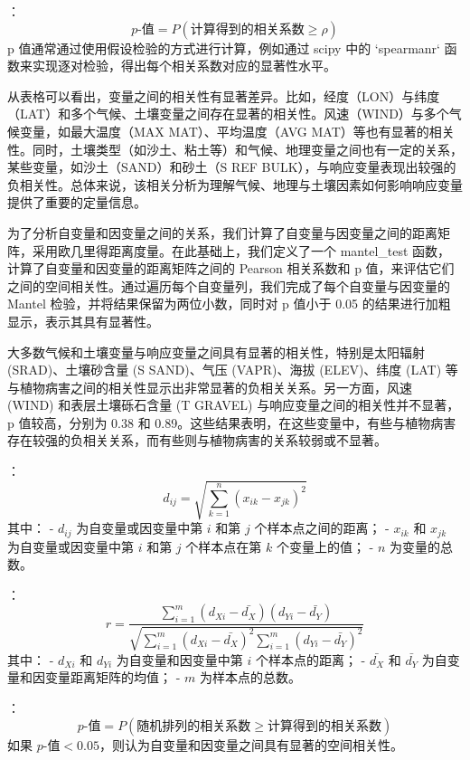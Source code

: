 \documentclass[AutoFakeBold]{LZUThesis-PgD&PhD}
\begin{document}
	：
	\[
	p\text{-值} = P(\text{计算得到的相关系数} \geq \rho)
	\]
	p 值通常通过使用假设检验的方式进行计算，例如通过 scipy 中的 `spearmanr` 函数来实现逐对检验，得出每个相关系数对应的显著性水平。
	
	从表格可以看出，变量之间的相关性有显著差异。比如，经度（LON）与纬度（LAT）和多个气候、土壤变量之间存在显著的相关性。风速（WIND）与多个气候变量，如最大温度（MAX MAT）、平均温度（AVG MAT）等也有显著的相关性。同时，土壤类型（如沙土、粘土等）和气候、地理变量之间也有一定的关系，某些变量，如沙土（SAND）和砂土（S REF BULK），与响应变量表现出较强的负相关性。总体来说，该相关分析为理解气候、地理与土壤因素如何影响响应变量提供了重要的定量信息。
	
	为了分析自变量和因变量之间的关系，我们计算了自变量与因变量之间的距离矩阵，采用欧几里得距离度量。在此基础上，我们定义了一个 mantel\_test 函数，计算了自变量和因变量的距离矩阵之间的 Pearson 相关系数和 p 值，来评估它们之间的空间相关性。通过遍历每个自变量列，我们完成了每个自变量与因变量的 Mantel 检验，并将结果保留为两位小数，同时对 p 值小于 0.05 的结果进行加粗显示，表示其具有显著性。
	
	大多数气候和土壤变量与响应变量之间具有显著的相关性，特别是太阳辐射 (SRAD)、土壤砂含量 (S SAND)、气压 (VAPR)、海拔 (ELEV)、纬度 (LAT) 等与植物病害之间的相关性显示出非常显著的负相关关系。另一方面，风速 (WIND) 和表层土壤砾石含量 (T GRAVEL) 与响应变量之间的相关性并不显著，p 值较高，分别为 0.38 和 0.89。这些结果表明，在这些变量中，有些与植物病害存在较强的负相关关系，而有些则与植物病害的关系较弱或不显著。
	
	
	：
	\[
	d_{ij} = \sqrt{\sum_{k=1}^{n} (x_{ik} - x_{jk})^2}
	\]
	其中：
	- \( d_{ij} \) 为自变量或因变量中第 \(i\) 和第 \(j\) 个样本点之间的距离；
	- \( x_{ik} \) 和 \( x_{jk} \) 为自变量或因变量中第 \(i\) 和第 \(j\) 个样本点在第 \(k\) 个变量上的值；
	- \( n \) 为变量的总数。
	
	：
	\[
	r = \frac{\sum_{i=1}^{m} (d_{Xi} - \bar{d_X})(d_{Yi} - \bar{d_Y})}{\sqrt{\sum_{i=1}^{m} (d_{Xi} - \bar{d_X})^2 \sum_{i=1}^{m} (d_{Yi} - \bar{d_Y})^2}}
	\]
	其中：
	- \( d_{Xi} \) 和 \( d_{Yi} \) 为自变量和因变量中第 \(i\) 个样本点的距离；
	- \( \bar{d_X} \) 和 \( \bar{d_Y} \) 为自变量和因变量距离矩阵的均值；
	- \( m \) 为样本点的总数。
	
	：
	\[
	p\text{-值} = P(\text{随机排列的相关系数} \geq \text{计算得到的相关系数})
	\]
	如果 \( p\text{-值} < 0.05 \)，则认为自变量和因变量之间具有显著的空间相关性。
	
\end{document}

